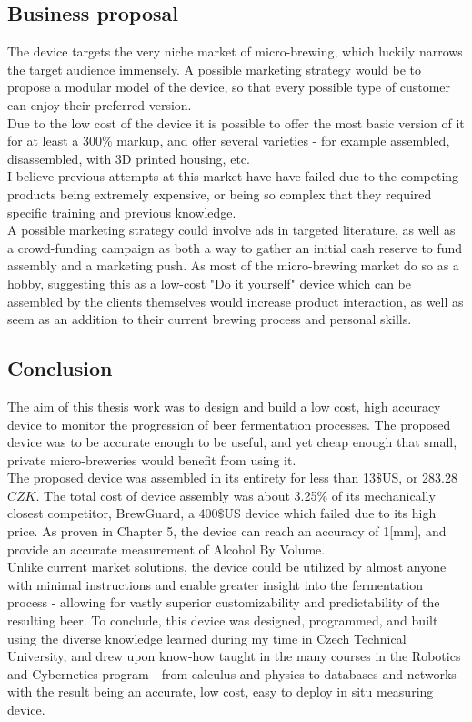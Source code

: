 \documentclass[twoside]{ctuthesis}
\theoremstyle{plain}
\theoremstyle{definition}
\theoremstyle{note}
\begin{document}
\subsection{Business proposal}
The device targets the very niche market of micro-brewing, which luckily narrows the target audience immensely. A possible marketing strategy would be to propose a modular model of the device, so that every possible type of customer can enjoy their preferred version.\\
Due to the low cost of the device it is possible to offer the most basic version of it for at least a 300$\%$ markup, and offer several varieties - for example assembled, disassembled, with 3D printed housing, etc.\\
I believe previous attempts at this market have have failed due to the competing products being extremely expensive, or being so complex that they required specific training and previous knowledge.\\
A possible marketing strategy could involve ads in targeted literature, as well as a crowd-funding campaign as both a way to gather an initial cash reserve to fund assembly and a marketing push. As most of the micro-brewing market do so as a hobby, suggesting this as a low-cost "Do it yourself" device which can be assembled by the clients themselves would increase product interaction, as well as seem as an addition to their current brewing process and personal skills.

\subsection{Conclusion}
The aim of this thesis work was to design and build a low cost, high accuracy device to monitor the progression of beer fermentation processes. The proposed device was to be accurate enough to be useful, and yet cheap enough that small, private micro-breweries would benefit from using it.\\ 
The proposed device was assembled in its entirety for less than 13$\$$US, or 283.28 $CZK$. The total cost of device assembly was about 3.25$\%$ of its mechanically closest competitor, BrewGuard, a 400$\$$US device which failed due to its high price. As proven in Chapter 5, the device can reach an accuracy of 1[mm], and provide an accurate measurement of Alcohol By Volume.\\
Unlike current market solutions, the device could be utilized by almost anyone with minimal instructions and enable greater insight into the fermentation process - allowing for vastly superior customizability and predictability of the resulting beer.
To conclude, this device was designed, programmed, and built using the diverse knowledge learned during my time in Czech Technical University, and drew upon know-how taught in the many courses in the Robotics and Cybernetics program - from calculus and physics to databases and networks - with the result being an accurate, low cost, easy to deploy in situ measuring device.
\end{document}

